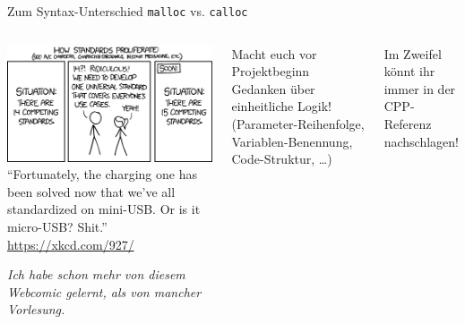\begin{frame}{Zum Syntax-Unterschied \texttt{malloc} vs. \texttt{calloc}}
%
\begin{columns}
\begin{center}
\includegraphics[width=\linewidth]{./gfx/xkcd_standards}
\newline
\tiny{\enquote{Fortunately, the charging one has been solved now that we've all standardized on mini-USB. Or is it micro-USB? Shit.}}\\
\tiny\url{https://xkcd.com/927/}

\vspace{3pt}
\tiny{\emph{Ich habe schon mehr von diesem Webcomic gelernt, als von mancher Vorlesung.}}
\end{center}
%
\begin{hintbox}
Macht euch vor Projektbeginn Gedanken über einheitliche Logik! (Parameter-Reihenfolge, Variablen-Benennung, Code-Struktur, \ldots)
\end{hintbox}
%
\begin{hintbox}
Im Zweifel könnt ihr immer in der CPP-Referenz nachschlagen!
\end{hintbox}
\end{columns}
%
\end{frame}


